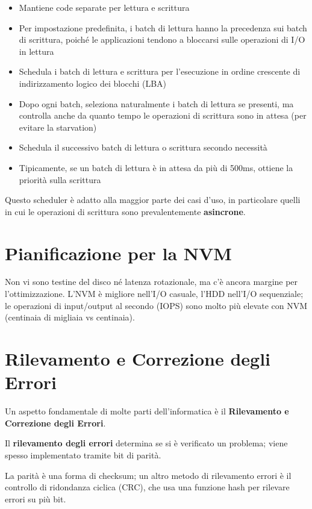 \begin{itemize}
  \item[-] Mantiene code separate per lettura e scrittura
  \item[-] Per impostazione predefinita, i batch di lettura hanno la precedenza sui batch di scrittura, poiché le applicazioni tendono a bloccarsi sulle operazioni di I/O in lettura
  \item[-] Schedula i batch di lettura e scrittura per l'esecuzione in ordine crescente di indirizzamento logico dei blocchi (LBA)
  \item[-] Dopo ogni batch, seleziona naturalmente i batch di lettura se presenti, ma controlla anche da quanto tempo le operazioni di scrittura sono in attesa (per evitare la starvation)
  \item[-] Schedula il successivo batch di lettura o scrittura secondo necessità
  \item[-] Tipicamente, se un batch di lettura è in attesa da più di 500ms, ottiene la priorità sulla scrittura
\end{itemize}

Questo scheduler è adatto alla maggior parte dei casi d'uso, in particolare quelli in cui le
operazioni di scrittura sono prevalentemente \textbf{asincrone}.


\section{Pianificazione per la NVM}
Non vi sono testine del disco né latenza rotazionale, ma c'è ancora margine per l'ottimizzazione. L'NVM è migliore nell'I/O casuale, l'HDD nell'I/O sequenziale; le operazioni di input/output al secondo (IOPS) sono molto più elevate con NVM (centinaia di migliaia vs centinaia).


\section{Rilevamento e Correzione degli Errori}

Un aspetto fondamentale di molte parti dell'informatica è il \textbf{Rilevamento e Correzione degli Errori}.

Il \textbf{rilevamento degli errori} determina se si è verificato un problema; viene spesso implementato tramite bit di parità.

La parità è una forma di checksum; un altro metodo di rilevamento errori è il controllo di ridondanza ciclica (CRC), che usa una funzione hash per rilevare errori su più bit.

